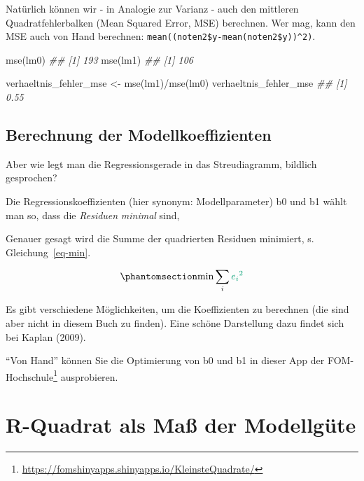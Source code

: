 \documentclass[
  letterpaper,
]{scrbook}
\newenvironment{Shaded}{\begin{snugshade}}{\end{snugshade}}
\newcommand{\DocumentationTok}[1]{\textcolor[rgb]{0.37,0.37,0.37}{\textit{#1}}}
\newcommand{\FunctionTok}[1]{\textcolor[rgb]{0.28,0.35,0.67}{#1}}
\newcommand{\NormalTok}[1]{\textcolor[rgb]{0.00,0.23,0.31}{#1}}
\newcommand{\OtherTok}[1]{\textcolor[rgb]{0.00,0.23,0.31}{#1}}
\newcommand{\SpecialCharTok}[1]{\textcolor[rgb]{0.37,0.37,0.37}{#1}}
\theoremstyle{definition}
\theoremstyle{definition}
\theoremstyle{definition}
\theoremstyle{remark}
\begin{document}
Natürlich können wir - in Analogie zur Varianz - auch den mittleren
Quadratfehlerbalken (Mean Squared Error, MSE) berechnen. Wer mag, kann
den MSE auch von Hand berechnen:
\texttt{mean((noten2\$y-mean(noten2\$y))\^{}2)}.

\begin{Shaded}
\begin{Highlighting}[]
\FunctionTok{mse}\NormalTok{(lm0)}
\DocumentationTok{\#\# [1] 193}
\FunctionTok{mse}\NormalTok{(lm1)}
\DocumentationTok{\#\# [1] 106}
\end{Highlighting}
\end{Shaded}

\begin{Shaded}
\begin{Highlighting}[]
\NormalTok{verhaeltnis\_fehler\_mse }\OtherTok{\textless{}{-}} \FunctionTok{mse}\NormalTok{(lm1)}\SpecialCharTok{/}\FunctionTok{mse}\NormalTok{(lm0)}
\NormalTok{verhaeltnis\_fehler\_mse}
\DocumentationTok{\#\# [1] 0.55}
\end{Highlighting}
\end{Shaded}

\subsection{Berechnung der
Modellkoeffizienten}\label{berechnung-der-modellkoeffizienten}

Aber wie legt man die Regressionsgerade in das Streudiagramm, bildlich
gesprochen?

Die Regressionskoeffizienten (hier synonym: Modellparameter) b0 und b1
wählt man so, dass die \emph{Residuen} \emph{minimal} sind,

Genauer gesagt wird die Summe der quadrierten {Residuen} minimiert, s.
Gleichung~\ref{eq-min}.

\begin{equation}\phantomsection\label{eq-min}{\text{min}\sum_i \color{errorcol}{e_i}^2}\end{equation}

Es gibt verschiedene Möglichkeiten, um die Koeffizienten zu berechnen
(die sind aber nicht in diesem Buch zu finden). Eine schöne Darstellung
dazu findet sich bei Kaplan (2009).

``Von Hand'' können Sie die Optimierung von b0 und b1 in dieser App der
FOM-Hochschule\footnote{\url{https://fomshinyapps.shinyapps.io/KleinsteQuadrate/}}
ausprobieren.

\section{R-Quadrat als Maß der
Modellgüte}\label{r-quadrat-als-mauxdf-der-modellguxfcte}
\end{document}
